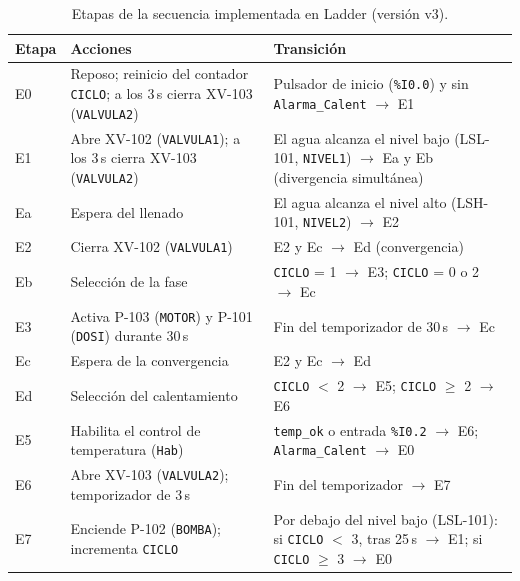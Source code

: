 \begin{table}[H]
\centering
\footnotesize
\caption{Etapas de la secuencia implementada en Ladder (versión v3).}
\label{tab:etapas_ladder}
\begin{tabularx}{\textwidth}{L{1.3cm}YY}
\toprule
\textbf{Etapa} & \textbf{Acciones} & \textbf{Transición}\\
\midrule
E0 & Reposo; reinicio del contador \texttt{CICLO}; a los 3\,s cierra XV-103 (\texttt{VALVULA2}) & Pulsador de inicio (\texttt{\%I0.0}) y sin \texttt{Alarma\_Calent} $\rightarrow$ E1\\
E1 & Abre XV-102 (\texttt{VALVULA1}); a los 3\,s cierra XV-103 (\texttt{VALVULA2}) & El agua alcanza el nivel bajo (LSL-101, \texttt{NIVEL1}) $\rightarrow$ Ea y Eb (divergencia simultánea)\\
Ea & Espera del llenado & El agua alcanza el nivel alto (LSH-101, \texttt{NIVEL2}) $\rightarrow$ E2\\
E2 & Cierra XV-102 (\texttt{VALVULA1}) & E2 y Ec $\rightarrow$ Ed (convergencia)\\
Eb & Selección de la fase & \texttt{CICLO} = 1 $\rightarrow$ E3; \texttt{CICLO} = 0 o 2 $\rightarrow$ Ec\\
E3 & Activa P-103 (\texttt{MOTOR}) y P-101 (\texttt{DOSI}) durante 30\,s & Fin del temporizador de 30\,s $\rightarrow$ Ec\\
Ec & Espera de la convergencia & E2 y Ec $\rightarrow$ Ed\\
Ed & Selección del calentamiento & \texttt{CICLO} $<$ 2 $\rightarrow$ E5; \texttt{CICLO} $\geq$ 2 $\rightarrow$ E6\\
E5 & Habilita el control de temperatura (\texttt{Hab}) & \texttt{temp\_ok} o entrada \texttt{\%I0.2} $\rightarrow$ E6; \texttt{Alarma\_Calent} $\rightarrow$ E0\\
E6 & Abre XV-103 (\texttt{VALVULA2}); temporizador de 3\,s & Fin del temporizador $\rightarrow$ E7\\
E7 & Enciende P-102 (\texttt{BOMBA}); incrementa \texttt{CICLO} & Por debajo del nivel bajo (LSL-101): si \texttt{CICLO} $<$ 3, tras 25\,s $\rightarrow$ E1; si \texttt{CICLO} $\geq$ 3 $\rightarrow$ E0\\
\bottomrule
\end{tabularx}
\end{table}

